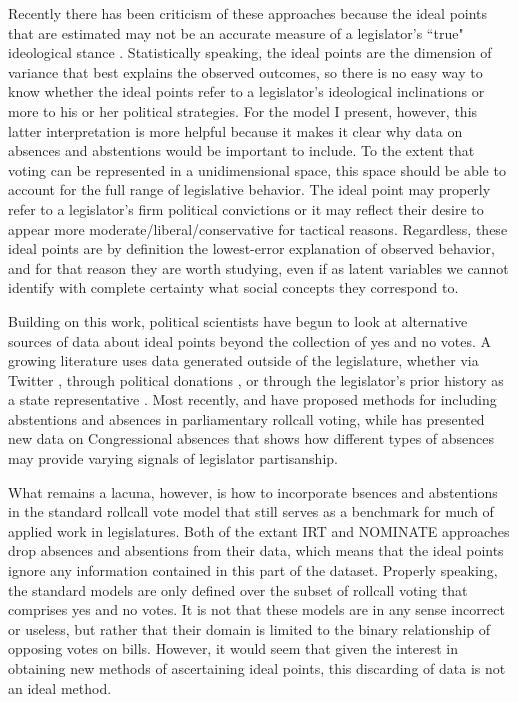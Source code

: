 	Recently there has been criticism of these approaches because the ideal points that are estimated may not be an accurate measure of a legislator's ``true" ideological stance \parencite{krehbiel2014,Caughey2016,brauninger2016}. Statistically speaking, the ideal points are the dimension of variance that best explains the observed outcomes, so there is no easy way to know whether the ideal points refer to a legislator's ideological inclinations or more to his or her political strategies. For the model I present, however, this latter interpretation is more helpful because it makes it clear why data on absences and abstentions would be important to include. To the extent that voting can be represented in a unidimensional space, this space should be able to account for the full range of legislative behavior. The ideal point may properly refer to a legislator's firm political convictions or it may reflect their desire to appear more moderate/liberal/conservative for tactical reasons. Regardless, these ideal points are by definition the lowest-error explanation of observed behavior, and for that reason they are worth studying, even if as latent variables we cannot identify with complete certainty what social concepts they correspond to.
	
	Building on this work, political scientists have begun to look at alternative sources of data about ideal points beyond the collection of yes and no votes. A growing literature uses data generated outside of the legislature, whether via Twitter \parencite{barbera2015}, through political donations \parencite{bonica2014}, or through the legislator's prior history as a state representative \parencite{shor2011}. Most recently, \textcite{brauninger2016} and \textcite{rosas2015} have proposed methods for including abstentions and absences in parliamentary rollcall voting, while \textcite{powell2016} has presented new data on Congressional absences that shows how different types of absences may provide varying signals of legislator partisanship.
	
	What remains a lacuna, however, is how to incorporate bsences and abstentions in the standard rollcall vote model that still serves as a benchmark for much of applied work in legislatures. Both of the extant IRT and NOMINATE approaches drop absences and absentions from their data, which means that the ideal points ignore any information contained in this part of the dataset. Properly speaking, the standard models are only defined over the subset of rollcall voting that comprises yes and no votes. It is not that these models are in any sense incorrect or useless, but rather that their domain is limited to the binary relationship of opposing votes on bills. However, it would seem that given the interest in obtaining new methods of ascertaining ideal points, this discarding of data is not an ideal method.
	
